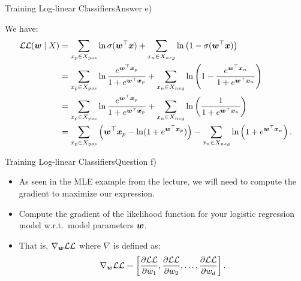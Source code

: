 \documentclass[t]{beamer}
\begin{document}
\begin{frame}{Training Log-linear Classifiers}{Answer e)}
    \begin{itemize}
        {\small
        \item We have:
              \begin{align}
                  \mathcal{LL}({\boldsymbol{w}}\mid X) & = \sum_{x_p\in X_{pos}}\ln\sigma({\boldsymbol{w}}^\top{\boldsymbol{x}}) + \sum_{x_n\in X_{neg}}\ln\left(1 - \sigma({\boldsymbol{w}}^\top{\boldsymbol{x}})\right)                                                          \\
                                      & = \sum_{x_p\in X_{pos}}\ln \frac{e^{{\boldsymbol{w}}^\top{\boldsymbol{x}}_p}}{1 + e^{{\boldsymbol{w}}^\top{\boldsymbol{x}}_p}} + \sum_{x_n\in X_{neg}}\ln\left(1 - \frac{e^{{\boldsymbol{w}}^\top{\boldsymbol{x}}_n}}{1 + e^{{\boldsymbol{w}}^\top{\boldsymbol{x}}_n}}\right) \\
                                      & = \sum_{x_p\in X_{pos}}\ln \frac{e^{{\boldsymbol{w}}^\top{\boldsymbol{x}}_p}}{1 + e^{{\boldsymbol{w}}^\top{\boldsymbol{x}}_p}} + \sum_{x_n\in X_{neg}}\ln\left(\frac{1}{1 + e^{{\boldsymbol{w}}^\top{\boldsymbol{x}}_n}}\right)                     \\
                                      & = \sum_{x_p\in X_{pos}} \left({\boldsymbol{w}}^\top{\boldsymbol{x}}_p - \ln(1 + e^{{\boldsymbol{w}}^\top{\boldsymbol{x}}_p})\right) - \sum_{x_n\in X_{neg}}\ln\left(1 + e^{{\boldsymbol{w}}^\top{\boldsymbol{x}}_n}\right).
              \end{align}
              }
    \end{itemize}
\end{frame}

\begin{frame}{Training Log-linear Classifiers}{Question f)}
    \begin{itemize}
        \item As seen in the MLE example from the lecture, we will need to
              compute the gradient to maximize our expression.
        \item Compute the gradient of the likelihood function for your logistic
              regression model w.r.t.\ model parameters ${\boldsymbol{w}}$.
        \item That is, $\nabla_{{\boldsymbol{w}}}\mathcal{LL}$ where $\nabla$ is defined as:
              \begin{align}\label{eq:gradient}
                  \nabla_{{\boldsymbol{w}}}\mathcal{LL} = \left[\frac{\partial\mathcal{LL}}{\partial w_1},
                      \frac{\partial\mathcal{LL}}{\partial w_2}, \ldots, \frac{\partial\mathcal{LL}}{\partial w_d}\right].
              \end{align}
    \end{itemize}
\end{frame}
\end{document}
